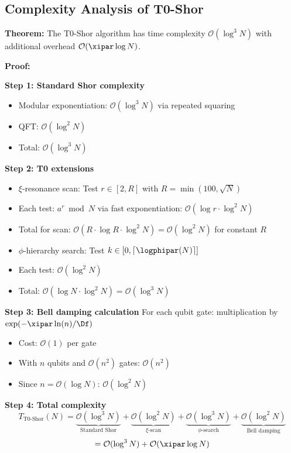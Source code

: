 \subsection{Complexity Analysis of T0-Shor}
\label{app:complexity}

\textbf{Theorem:} The T0-Shor algorithm has time complexity $\mathcal{O}(\log^3 N)$ with additional overhead $\mathcal{O}(\xipar \log N)$.

\textbf{Proof:}

\textbf{Step 1: Standard Shor complexity}
\begin{itemize}
	\item Modular exponentiation: $\mathcal{O}(\log^3 N)$ via repeated squaring
	\item QFT: $\mathcal{O}(\log^2 N)$
	\item Total: $\mathcal{O}(\log^3 N)$
\end{itemize}

\textbf{Step 2: T0 extensions}
\begin{itemize}
	\item $\xi$-resonance scan: Test $r \in [2, R]$ with $R = \min(100, \sqrt{N})$
	\item Each test: $a^r \bmod N$ via fast exponentiation: $\mathcal{O}(\log r \cdot \log^2 N)$
	\item Total for scan: $\mathcal{O}(R \cdot \log R \cdot \log^2 N) = \mathcal{O}(\log^2 N)$ for constant $R$
	\item $\phi$-hierarchy search: Test $k \in [0, \lceil \logphipar(N) \rceil]$
	\item Each test: $\mathcal{O}(\log^2 N)$
	\item Total: $\mathcal{O}(\log N \cdot \log^2 N) = \mathcal{O}(\log^3 N)$
\end{itemize}

\textbf{Step 3: Bell damping calculation}
For each qubit gate: multiplication by $\exp(-\xipar \ln(n)/\Df)$
\begin{itemize}
	\item Cost: $\mathcal{O}(1)$ per gate
	\item With $n$ qubits and $\mathcal{O}(n^2)$ gates: $\mathcal{O}(n^2)$
	\item Since $n = \mathcal{O}(\log N)$: $\mathcal{O}(\log^2 N)$
\end{itemize}

\textbf{Step 4: Total complexity}
\[
T_{\text{T0-Shor}}(N) = \underbrace{\mathcal{O}(\log^3 N)}_{\text{Standard Shor}} 
+ \underbrace{\mathcal{O}(\log^2 N)}_{\xi\text{-scan}} 
+ \underbrace{\mathcal{O}(\log^3 N)}_{\phi\text{-search}} 
+ \underbrace{\mathcal{O}(\log^2 N)}_{\text{Bell damping}}
\]
\[
= \mathcal{O}(\log^3 N) + \mathcal{O}(\xipar \log N)
\]

